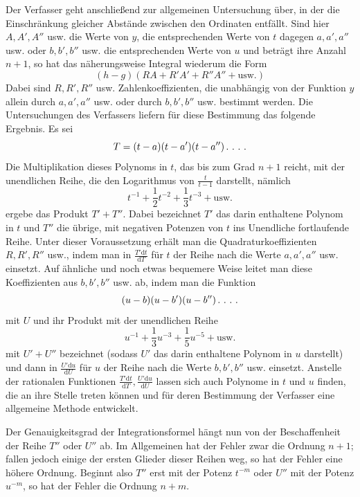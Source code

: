 Der Verfasser geht anschließend zur allgemeinen Untersuchung über, in der die Einschränkung gleicher Abstände zwischen den Ordinaten entfällt. Sind hier \(A,A',A''\) usw. die Werte von \(y\), die entsprechenden Werte von \(t\) dagegen \(a,a',a''\) usw. oder \(b,b',b''\) usw. die entsprechenden Werte von \(u\) und beträgt ihre Anzahl \(n+1\), so hat das näherungsweise Integral wiederum die Form
\[
(h-g)(RA+R'A'+R''A''+\text{usw.})
\]
Dabei sind \(R,R',R''\) usw. Zahlenkoeffizienten, die unabhängig von der Funktion \(y\) allein durch \(a,a',a''\) usw. oder durch \(b,b',b''\) usw. bestimmt werden. Die Untersuchungen des Verfassers liefern für diese Bestimmung das folgende Ergebnis. Es sei
\[
T=(t-a)(t-a')(t-a'')\,\ldotp\,\ldotp\,\ldotp\,\ldotp
\]
Die Multiplikation dieses Polynoms in \(t\), das bis zum Grad \(n+1\) reicht, mit der unendlichen Reihe, die den Logarithmus von \(\frac{t}{t-1}\) darstellt, nämlich
\[
t^{-1}+\frac12t^{-2}+\frac13t^{-3}+\text{usw.}
\]
ergebe das Produkt \(T'+T''\). Dabei bezeichnet \(T'\) das darin enthaltene Polynom in \(t\) und \(T''\) die übrige, mit negativen Potenzen von \(t\) ins Unendliche fortlaufende Reihe. Unter dieser Voraussetzung erhält man die Quadraturkoeffizienten \(R,R',R''\) usw., indem man in \(\frac{T'\mathrm{d}t}{\mathrm{d}T}\) für \(t\) der Reihe nach die Werte \(a,a',a''\) usw. einsetzt. Auf ähnliche und noch etwas bequemere Weise leitet man diese Koeffizienten aus \(b,b',b''\) usw. ab, indem man die Funktion
\[
(u-b)(u-b')(u-b'')\,\ldotp\,\ldotp\,\ldotp\,\ldotp
\]
mit \(U\) und ihr Produkt mit der unendlichen Reihe
\[
u^{-1}+\frac13u^{-3}+\frac15u^{-5}+\text{usw.}
\]
mit \(U'+U''\) bezeichnet (sodass \(U'\) das darin enthaltene Polynom in \(u\) darstellt) und dann in \(\frac{U'\mathrm{d}u}{\mathrm{d}U}\) für \(u\) der Reihe nach die Werte \(b,b',b''\) usw. einsetzt. Anstelle der rationalen Funktionen \(\frac{T'\mathrm{d}t}{\mathrm{d}T},\frac{U'\mathrm{d}u}{\mathrm{d}U}\) lassen sich auch Polynome in \(t\) und \(u\) finden, die an ihre Stelle treten können und für deren Bestimmung der Verfasser eine allgemeine Methode entwickelt.

Der Genauigkeitsgrad der Integrationsformel hängt nun von der Beschaffenheit der Reihe \(T''\) oder \(U''\) ab. Im Allgemeinen hat der Fehler zwar die Ordnung \(n+1\); fallen jedoch einige der ersten Glieder dieser Reihen weg, so hat der Fehler eine höhere Ordnung. Beginnt also \(T''\) erst mit der Potenz \(t^{-m}\) oder \(U''\) mit der Potenz \(u^{-m}\), so hat der Fehler die Ordnung \(n+m\).

